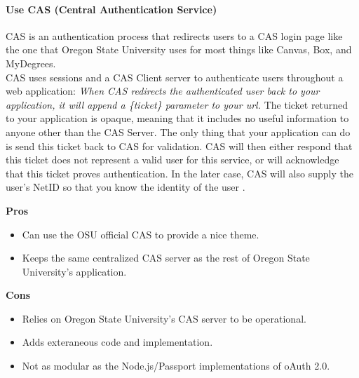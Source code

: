 \paragraph{Use CAS (Central Authentication Service)}
CAS is an authentication process that redirects users to a CAS login page like the one that Oregon State University uses for most things like Canvas, Box, and MyDegrees.\\

CAS uses sessions and a CAS Client server to authenticate users throughout a web application:
\textit{When CAS redirects the authenticated user back to your application, it will append a \{ticket\} parameter to your url.}
The ticket returned to your application is opaque, meaning that it includes no useful information to anyone other than the CAS Server. The only thing that your application can do is send this ticket back to CAS for validation.
CAS will then either respond that this ticket does not represent a valid user for this service, or will acknowledge that this ticket proves authentication. In the later case, CAS will also supply the user's NetID so that you know the identity of the user \cite{how_cas_works}.

\textbf{Pros}
\begin{itemize}
    \item Can use the OSU official CAS to provide a nice theme.
    \item Keeps the same centralized CAS server as the rest of Oregon State University's application.
\end{itemize}
\textbf{Cons}
\begin{itemize}
    \item Relies on Oregon State University's CAS server to be operational. 
    \item Adds exteraneous code and implementation.
    \item Not as modular as the Node.js/Passport implementations of oAuth 2.0.
\end{itemize}
